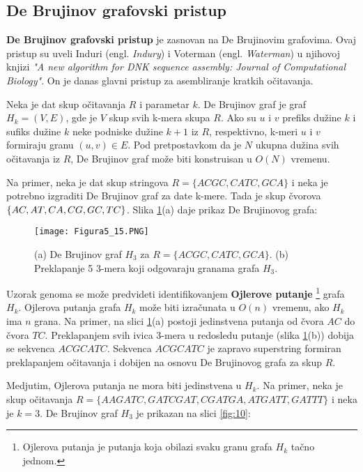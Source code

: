 \documentclass[12pt,oneside]{memoir}
\begin{document}
\subsection{De Brujinov grafovski pristup}

\textbf{De Brujinov grafovski pristup} je zasnovan na De Brujinovim grafovima. Ovaj pristup su uveli Induri (engl. \textit{Indury}) i Voterman (engl. \textit{Waterman}) u njihovoj knjizi \textit{"A new algorithm for DNK sequence assembly: Journal of Computational Biology"}. On je danas glavni pristup za asembliranje kratkih očitavanja.

Neka je dat skup očitavanja $R$ i parametar $k$. De Brujinov graf je graf $H_k = (V, E)$, gde je $V$ skup svih k-mera skupa $R$. Ako su $u$ i $v$ prefiks dužine $k$ i sufiks dužine $k$ neke podniske dužine $k + 1$ iz $R$, respektivno, k-meri $u$ i $v$ formiraju granu $(u, v) \in E$. Pod pretpostavkom da je $N$ ukupna dužina svih očitavanja iz $R$, De Brujinov graf može biti konstruisan u $O(N)$ vremenu.

Na primer, neka je dat skup stringova $R = \{ACGC, CATC, GCA\}$ i neka je potrebno izgraditi De Brujinov graf za date k-mere. Tada je skup čvorova $\{AC, AT, \\ CA, CG, GC, TC\}$. Slika \ref{fig:9}(a) daje prikaz De Brujinovog grafa:

\begin{figure}[!ht]
\centering
\texttt{[image: Figura5\_15.PNG]}
\caption{(a) De Brujinov graf $H_3$ za $R = \{ACGC, CATC, GCA\}$. (b)
 Preklapanje 5 3-mera koji odgovaraju granama grafa $H_3$.}
 \label{fig:9}
 \end{figure}

Uzorak genoma se može predvideti identifikovanjem \textbf{Ojlerove putanje} \footnote{Ojlerova putanja je putanja koja obilazi svaku granu grafa $H_k$ tačno jednom.} grafa $H_k$. Ojlerova putanja grafa $H_k$ može biti izračunata u $O(n)$ vremenu, ako $H_k$ ima $n$ grana. Na primer, na slici \ref{fig:9}(a) postoji jedinstvena putanja od čvora $AC$ do čvora $TC$. Preklapanjem svih ivica 3-mera u redosledu putanje (slika \ref{fig:9}(b)) dobija se sekvenca $ACGCATC$. Sekvenca $ACGCATC$ je zapravo superstring formiran preklapanjem očitavanja i dobijen na osnovu De Brujinovog grafa za skup $R$.

Medjutim, Ojlerova putanja ne mora biti jedinstvena u $H_k$. Na primer, neka je skup očitavanja $R = \{AAGATC, GATCGAT, CGATGA, ATGATT, GATTT\}$ i neka je $k = 3$. De Brujinov graf $H_3$ je prikazan na slici  \ref{fig:10}: 
\end{document}
